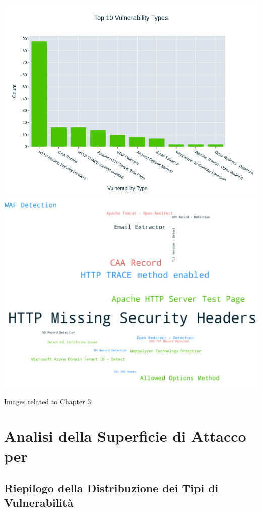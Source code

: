 \begin{center}
\includegraphics[width=\linewidth]{pngs/2_1.png}
\vspace{1cm}\includegraphics[width=\linewidth]{pngs/2_2.png}
\vspace{1cm}\caption{Images related to Chapter 3}
\end{center}
\chapter{Analisi della Superficie di Attacco per}

\section{Riepilogo della Distribuzione dei Tipi di Vulnerabilità}

